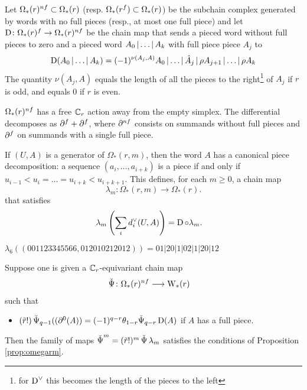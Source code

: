 Let $\Omega_*(r)^{nf}\subset \Omega_*(r)$ (resp. $\Omega_*(r^{f})\subset \Omega_*(r)$) be the subchain complex generated by words with no full pieces (resp., at most one full piece) and let $\operatorname{D}\colon \Omega_*(r)^{f}\to \Omega_*(r)^{nf}$ be the chain map that sends a pieced word  without full pieces to zero and a pieced word $A_0\operatorname{|}\ldots\operatorname{|} A_k$ with full piece piece $A_j$ to
\[
\operatorname{D}(A_0\operatorname{|} \ldots\operatorname{|} A_k) = (-1)^{\nu(A_{j},A)}A_0\operatorname{|} \ldots\operatorname{|} \hat{A}_{j}\operatorname{|} \rho A_{j+1}\operatorname{|} \ldots\operatorname{|} \rho A_k
\]
The quantity $\nu(A_j,A)$ equals the length of all the pieces to the right\footnote{for $\operatorname{D}^\vee$ this becomes the length of the pieces to the left} of $A_j$ if $r$ is odd, and equals $0$ if $r$ is even.

$\Omega_*(r)^{nf}$ has a free $\mathbb{C}_r$ action away from the empty simplex. The differential decomposes as $\partial^{f}+\partial^{f}$, where $\partial^{nf}$ consists on summands without full pieces and $\partial^{f}$ on summands with a single full piece.

If $(U,A)$ is a generator of $\Omega_*(r,m)$, then the word $A$ has a canonical piece decomposition: a sequence $(a_i,\ldots,a_{i+k})$ is a piece if and only if $u_{i-1}<u_i =\ldots= u_{i+k}<u_{i+k+1}$. This defines, for each $m\geq 0$, a chain map
\[\lambda_m\colon \Omega_*(r,m)\to \Omega_*(r).\]
that satisfies
\begin{align*}
	\lambda_m\left(\sum_i d_i^\vee(U,A)\right) &= \operatorname{D}\circ \lambda_m.
\end{align*}
%
\begin{example}\label{ex:106}
	$\lambda_6((001123345566,012010212012)) = 01|20|1|02|1|20|12$
\end{example}



\begin{lemma} \label{lemma:omegar}
	Suppose one is given a $\mathbb{C}_r$-equivariant chain map
	\begin{align*}
		\operatorname{\check{\Psi}}\colon \Omega_*(r)^{nf}&\longrightarrow \mathrm{W}_*(r)
	\end{align*}
	such that
	\begin{itemize}
		\item $(\tilde{r}!)\operatorname{\check{\Psi}}_{q-1}((\partial^0 (A)) = (-1)^{q-r}\theta_{1-r}\check{\Psi}_{q-r}\operatorname{D}(A)$ if $A$ has a full piece.
	\end{itemize}
	Then the family of maps $\operatorname{\check{\Psi}}^m = (\tilde{r}!)^{m}\operatorname{\check{\Psi}}\lambda_m$ satisfies the conditions of Proposition \ref{prop:omegarm}.
\end{lemma}

